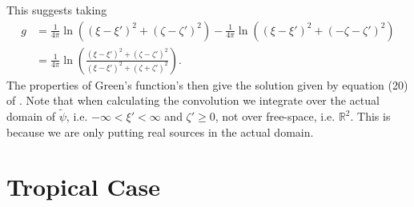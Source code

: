 \documentclass[12pt]{article}
\begin{document}
This suggests taking
\begin{align*}
g & = \frac{1}{4\pi}\ln\left(\left(\xi-\xi'\right)^2+\left(\zeta-\zeta'\right)^2\right) - \frac{1}{4\pi}\ln\left(\left(\xi-\xi'\right)^2+\left(-\zeta-\zeta'\right)^2\right) \\
& = \frac{1}{4\pi}\ln\left(\frac{\left(\xi-\xi'\right)^2+\left(\zeta-\zeta'\right)^2}{\left(\xi-\xi'\right)^2+\left(\zeta + \zeta'\right)^2}\right).
\end{align*}
The properties of Green's function's then give the solution given by equation (20) of \citet{rotunno83}. Note that when calculating the convolution we integrate over the actual domain of $\tilde{\psi}$, i.e. $-\infty<\xi'<\infty$ and $\zeta'\geq 0$, not over free-space, i.e. $\mathbb{R}^2$. This is because we are only putting real sources in the actual domain.

\section{Tropical Case}
\end{document}
